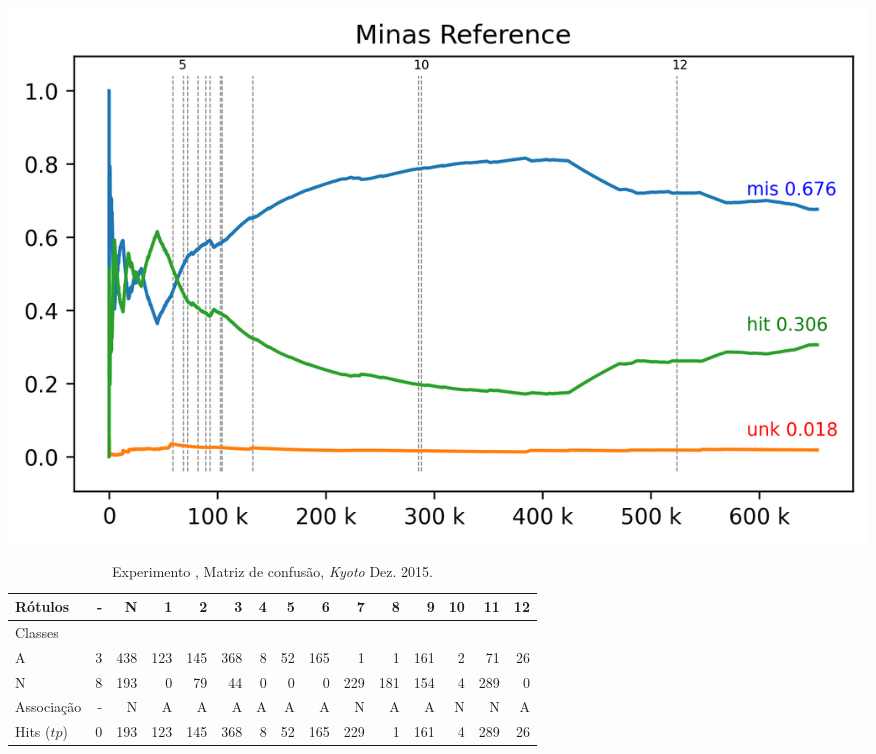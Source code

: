 \documentclass[aspectratio=1610,10pt]{beamer}
\begin{document}
\begin{frame}\centering
  \includegraphics[width=1\linewidth]{experiments/revised-java-log.png}
\end{frame}
\begin{frame}
  \footnotesize
  \begin{table}[hbt]
    \centering
    \caption{Experimento \expA, Matriz de confusão, \emph{Kyoto} Dez. 2015.}
    \label{tab:java-matrix}
    \begin{tabular}{l *{14}{|r} }
      Rótulos   &     - &       N &    1 &    2 &    3 &  4 &   5 &    6 &    7 &     8 &    9 &    10 &   11 &  12 \\\hline
      Classes  &       &         &      &      &      &    &     &      &      &       &      &       &      &     \\\hline
      \hline
      A        &  3 &  438 &  123 &  145 &  368 &  8 &  52 &  165 &    1 &  1 &  161 &  2 &   71 &  26 \\\hline
      N        &  8 &  193 &    0 &   79 &   44 &  0 &   0 &    0 &  229 &   181 &  154 &  4 &  289 &   0 \\\hline
      \hline
      Associação &     - &       N &    A &    A &    A &  A &   A &    A &    N &     A &    A &     N &    N &   A \\\hline
      Hits ($tp$)     &     0 &  193 &  123 &  145 &  368 &  8 &  52 &  165 &  229 &  1 &  161 &  4 &  289 &  26 
    \end{tabular}
  \end{table}
\end{frame}
\end{document}
